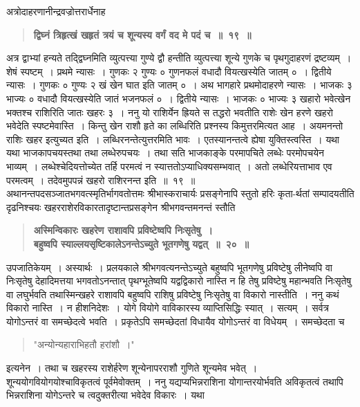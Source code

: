 \documentclass[11pt, openany]{book}
\begin{document}
\begin{sloppypar}
{\small अत्रोदाहरणानीन्द्रवज्रोत्तरार्धेनाह\textendash }

 \label{2.19}
\begin{quote}
{\large \textbf{{\color{purple}द्विघ्नं त्रिहृत्खं खहृतं त्रयं च शून्यस्य वर्गं वद मे पदं च~॥~१९~॥}}}
\end{quote}

अत्र द्वाभ्यां हन्यते तद्द्विघ्नमिति व्युत्पत्त्या गुण्ये द्वौ हन्तीति व्युत्पत्त्या शून्ये गुणके च पृथगुदाहरणं द्रष्टव्यम्~। शेषं स्पष्टम्~। प्रथमे न्यासः~। गुणकः २ गुण्यः ० गुणनफलं वधादौ वियत्खस्येति जातम् ०~। द्वितीये न्यासः~। गुणकः ० गुण्यः २ खं खेन  घात इति जातम् ०~। अथ भागहारे प्रथमोदाहरणे न्यासः~। भाजकः ३ भाज्यः ० वधादौ वियत्खस्येति जातं भजनफलं ०~। द्वितीये न्यासः~। भाजकः ० भाज्यः ३ खहारो भवेत्खेन भक्तश्च राशिरिति जातः खहरः ३~। ननु यो राशिर्येन ह्रियते स तद्धरो भवतीति राशेः खेन हरणे खहरो भवेदेति स्पष्टमेवास्ति~। किन्तु खेन राशौ हृते का लब्धिरिति प्रश्नस्य किमुत्तरमित्यत आह~। अयमनन्तो राशिः खहर इत्युच्यत इति~। लब्धिरनन्तेत्युत्तरमिति भावः~। एतस्यानन्तत्वे ह्येषा युक्तिस्त्वस्ति~। यथा यथा भाजकापचयस्तथा तथा लब्धेरुपचयः~। तथा सति भाजकाङ्के परमापचिते लब्धेः परमोपचयेन भाव्यम्~। लब्धेश्चेदियत्तोच्येत तर्हि परमत्वं न स्यात्ततोऽप्याधिक्यसम्भवात्~। अतो लब्धेरियत्ताभाव एव परमत्वम्~। तदेवमुपपन्नं खहरो राशिरनन्त इति~॥~१९~॥\\

{\small अथानन्तपदसञ्जातभगवत्स्मृतिर्भागवतोत्तमः श्रीभास्कराचार्यः प्रसङ्गेनापि स्तुतो हरिः कृता-र्थतां सम्पादयतीति दृढनिश्चयः खहरराशेरविकारतादृष्टान्तप्रसङ्गेन श्रीभगवन्तमनन्तं स्तौति\textendash }

 \label{2.20}
\begin{quote}
{\large \textbf{{\color{purple}अस्मिन्विकारः खहरेण राशावपि प्रविष्टेष्वपि निःसृतेषु~।\\
बहुष्वपि स्याल्लयसृष्टिकालेऽनन्तेऽच्युते भूतगणेषु यद्वत्~॥~२०~॥ }}}
\end{quote}

उपजातिकेयम्~। अस्यार्थः~। प्रलयकाले श्रीभगवत्यनन्तेऽच्युते बहुष्वपि भूतगणेषु प्रविष्टेषु लीनेष्वपि वा निःसृतेषु देहादिमत्तया भगवतोऽनन्तात् पृथग्भूतेष्वपि यद्वद्विकारो नास्ति न हि तेषु प्रविष्टेषु महान्भवति निःसृतेषु वा लघुर्भवति तथास्मिन्खहरे राशावपि बहुष्वपि राशिषु प्रविष्टेषु निःसृतेषु वा विकारो नास्तीति~। ननु कथं विकारो नास्ति~। न हीशनिदेशः~। योगे वियोगे वाविकारस्य व्याप्तिसिद्धिः स्यात्~। सत्यम्~। सर्वत्र योगोऽन्तरं वा समच्छेदत्वे भवति~। प्रकृतेऽपि समच्छेदतां विधायैव योगोऽन्तरं वा विधेयम्~। समच्छेदता च\textendash
\vspace{-4mm}

\begin{quote}
{\color{violet}"अन्योन्यहाराभिहतौ हरांशौ~।" }
\end{quote}
\vspace{-2mm}

इत्यनेन~। तथा च खहरस्य राशेर्हरेण शून्येनापरराशौ गुणिते शून्यमेव भवेत्~। शून्ययोगवियोगयोश्चाविकृतत्वं पूर्वमेवोक्तम्~। ननु यद्यप्यभिन्नराशिना योगान्तरयोर्भवति अविकृतत्वं तथापि भिन्नराशिना योगेऽन्तरे च त्वदुक्तरीत्या भवेदेव विकारः~। यथा
\end{sloppypar}
\end{document}
